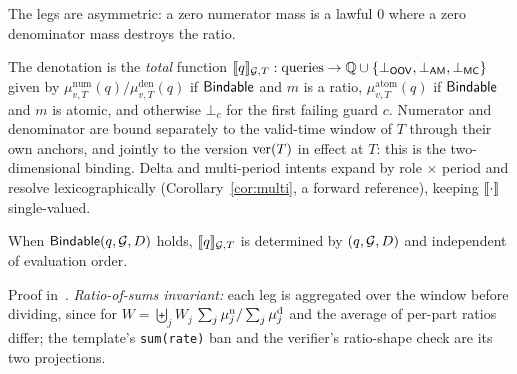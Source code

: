 The legs are asymmetric: a zero numerator mass is a lawful $0$ where a zero
denominator mass destroys the ratio.

\begin{definition}
\label{def:bracket}
 The denotation is the \emph{total} function $[\![q]\!]_{\mathcal{G},T}:
\text{queries}\to\mathbb{Q}\cup\{\bot_{\mathsf{OOV}},\bot_{\mathsf{AM}},\bot_{\mathsf{MC}}\}$ given by
$\mu^{\mathrm{num}}_{v,T}(q)/\mu^{\mathrm{den}}_{v,T}(q)$ if $\mathsf{Bindable}$ and
$m$ is a ratio, $\mu^{\mathrm{atom}}_{v,T}(q)$ if $\mathsf{Bindable}$ and $m$ is
atomic, and otherwise $\bot_c$ for the first failing guard $c$. Numerator and
denominator are bound separately to the valid-time window of $T$ through their
own anchors, and jointly to the version $\mathrm{ver}(T)$ in effect at $T$: this is
the two-dimensional binding. Delta and multi-period intents expand by role
$\times$ period and resolve lexicographically
(Corollary~\ref{cor:multi}, a forward
reference), keeping $[\![\cdot]\!]$ single-valued.
\end{definition}

\begin{proposition}
\label{prop:welldef}
 When $\mathsf{Bindable}(q,\mathcal{G},D)$ holds, $[\![q]\!]_{\mathcal{G},T}$ is determined by
$(q,\mathcal{G},D)$ and independent of evaluation order.
\end{proposition}

\noindent{} Proof in~\cite{asofgov-tr}. \emph{Ratio-of-sums invariant:} each leg is
aggregated over the window before dividing, since for $W=\biguplus_j W_j$
$\sum_j\mu^{\mathrm{n}}_j/\sum_j\mu^{\mathrm{d}}_j$ and the average of per-part ratios
differ; the template's \texttt{sum(rate)} ban and the verifier's ratio-shape
check are its two projections.


